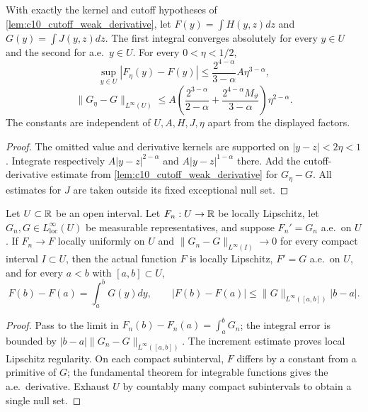 \begin{lemma}
  \label{lem:c10_cutoff_errors}
  With exactly the kernel and cutoff hypotheses of \cref{lem:c10_cutoff_weak_derivative}, let
  $F(y)=\int H(y,z)dz$ and $G(y)=\int J(y,z)dz$. The first integral converges absolutely for every
  $y\in U$ and the second for a.e.\ $y\in U$. For every $0<\eta<1/2$,
  \[
    \sup_{y\in U}|F_\eta(y)-F(y)|
      \le\frac{2^{4-\alpha}}{3-\alpha}A\eta^{3-\alpha},
  \]
  \[
    \|G_\eta-G\|_{L^\infty(U)}
      \le A\left(\frac{2^{3-\alpha}}{2-\alpha}
            +\frac{2^{4-\alpha}M_\vartheta}{3-\alpha}\right)\eta^{2-\alpha}.
  \]
  The constants are independent of $U,A,H,J,\eta$ apart from the displayed factors.
\end{lemma}
\begin{proof}
  The omitted value and derivative kernels are supported on $|y-z|<2\eta<1$.
  Integrate respectively $A|y-z|^{2-\alpha}$ and $A|y-z|^{1-\alpha}$ there.
  Add the cutoff-derivative estimate from \cref{lem:c10_cutoff_weak_derivative} for $G_\eta-G$.
  All estimates for $J$ are taken outside its fixed exceptional null set.
\end{proof}

\begin{lemma}
  \label{lem:c10_local_weak_limit}
  Let $U\subset\mathbb{R}$ be an open interval. Let $F_n:U\to\mathbb{R}$ be locally Lipschitz,
  let $G_n,G\in L^\infty_{\mathrm{loc}}(U)$ be measurable representatives, and suppose
  $F_n'=G_n$ a.e.\ on $U$. If $F_n\to F$ locally uniformly on $U$ and
  $\|G_n-G\|_{L^\infty(I)}\to0$ for every compact interval $I\subset U$, then the actual
  function $F$ is locally Lipschitz, $F'=G$ a.e.\ on $U$, and for every $a<b$ with $[a,b]\subset U$,
  \[
    F(b)-F(a)=\int_a^bG(y)dy,\qquad
    |F(b)-F(a)|\le\|G\|_{L^\infty([a,b])}|b-a|.
  \]
\end{lemma}
\begin{proof}
  Pass to the limit in $F_n(b)-F_n(a)=\int_a^bG_n$; the integral error is bounded by
  $|b-a|\|G_n-G\|_{L^\infty([a,b])}$. The increment estimate proves local Lipschitz regularity.
  On each compact subinterval, $F$ differs by a constant from a primitive of $G$; the fundamental
  theorem for integrable functions gives the a.e.\ derivative. Exhaust $U$ by countably many
  compact subintervals to obtain a single null set.
\end{proof}

